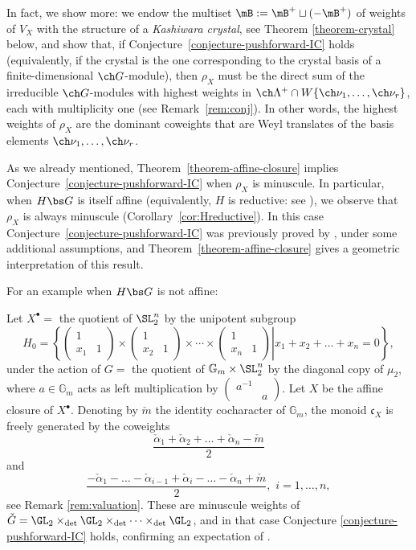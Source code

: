 In fact, we show more: we endow the multiset $\mB := \mB^+ \sqcup (-\mB^+)$ of weights of $V_X$ with the structure of a \emph{Kashiwara crystal}, see Theorem \ref{theorem-crystal} below, and show that, if Conjecture~\ref{conjecture-pushforward-IC} holds (equivalently, if the crystal is the one corresponding to the crystal basis of a finite-dimensional $\ch G$-module),
then $\rho_X$ must be the direct sum of the irreducible $\ch G$-modules with highest weights
in $\ch\Lambda^+ \cap W \{ \ch\nu_1,\dotsc,\ch\nu_r \}$, each with multiplicity one
(see Remark~\ref{rem:conj}).
In other words, the highest weights of $\rho_X$ are the dominant coweights that are Weyl translates
of the basis elements $\ch\nu_1,\dotsc,\ch\nu_r$.



As we already mentioned, Theorem~\ref{theorem-affine-closure} implies Conjecture~\ref{conjecture-pushforward-IC} when $\rho_X$ is minuscule.
In particular, when $H\bs G$ is itself affine (equivalently, $H$ is reductive: see \cite{Lun73,Richardson}),
we observe that $\rho_X$ is always minuscule (Corollary~\ref{cor:Hreductive}). In this case
Conjecture~\ref{conjecture-pushforward-IC} was previously proved by \cite[Theorem 7.2.1]{SaSph}, under some additional assumptions,
and Theorem~\ref{theorem-affine-closure} gives a geometric interpretation of this result.


For an example when $H\bs G$ is not affine:

\begin{eg}
\notready\label{example-nfold}
Let $X^\bullet=$ the quotient of $\SL_2^n$ by the unipotent subgroup
\[ H_0= \left\{ \left.\left(\begin{array}{cc} 1 \\ x_1 & 1\end{array}\right) \times \left(\begin{array}{cc} 1 \\ x_2 & 1\end{array}\right) \times \cdots \times\left(\begin{array}{cc} 1 \\ x_n & 1\end{array}\right) \right| x_1+ x_2 + \dots+ x_n = 0\right\},\]
under the action of $G = $ the quotient of $\mathbb G_m \times \SL_2^n$ by the diagonal copy of $\mu_2$, where $a\in \mathbb G_m$ acts as left multiplication by $\begin{pmatrix} a^{-1} \\ & a\end{pmatrix}$.
Let $X$ be the affine closure of $X^\bullet$. Denoting by $\check m$ the identity cocharacter of $\mathbb G_m$, the monoid $\mathfrak c_X$ is freely generated by the coweights
\[ \frac{\check\alpha_1+\check\alpha_2+\dots+\check\alpha_n - \check m}{2}\]
and
\[ \frac{-\check\alpha_1- \dots - \check\alpha_{i-1} + \check\alpha_i - \dots -\check\alpha_n + \check m}{2}, \,\, i =1,\dots, n,\]
see Remark \ref{rem:valuation}. These are minuscule weights of $\check G= \GL_2\times_{\det} \GL_2 \times_{\det} \cdots \times_{\det}\GL_2$, and in that case Conjecture \ref{conjecture-pushforward-IC} holds, confirming an expectation of \cite[\S 4.5]{SaRS}.
\end{eg}

